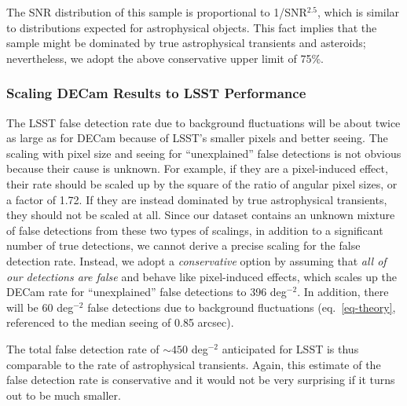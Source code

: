 The SNR distribution of this sample is proportional to 1/SNR$^{2.5}$, which
is similar to distributions expected for astrophysical objects. This fact implies
that the sample might be dominated by true astrophysical transients and
asteroids; nevertheless, we adopt the above conservative upper limit of 75\%.


\subsubsection{Scaling DECam Results to LSST Performance \label{sec:imDiffScale}}

The LSST false detection rate due to background fluctuations will be about twice
as large as for DECam because of LSST's smaller pixels and better seeing. The scaling
with pixel size and seeing for ``unexplained'' false detections is not obvious
because their cause is unknown. For example, if they are a pixel-induced effect,
their rate should be scaled up by the square of the ratio of angular pixel sizes, or
a factor of 1.72. If they are instead dominated by true astrophysical transients, 
they should not be scaled at all. Since our dataset contains an unknown 
mixture of false detections from these two types of scalings, in addition to a 
significant number of true detections, we cannot derive a precise scaling for the 
false detection rate. Instead, we adopt a {\it conservative} option by assuming
that {\it all of our detections are false} and behave like pixel-induced effects, 
which scales up the DECam rate for ``unexplained'' false detections to 396 deg$^{-2}$. 
In addition, there will be 60 deg$^{-2}$ false detections due to background fluctuations 
(eq.~\ref{eq-theory}, referenced to the median seeing of 0.85 arcsec).

The total false detection rate of $\sim450$ deg$^{-2}$ anticipated for LSST is thus
comparable to the rate of astrophysical transients. Again, this estimate of the false
detection rate is conservative and it would not be very surprising if it turns out
to be much smaller.

